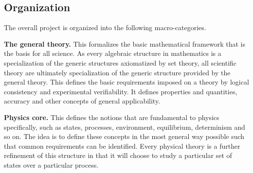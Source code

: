 \documentclass[twocolumn]{article}
\newif\ifextended
\newcommand\fact[2]{\ifextended \emph{#1}. #2 \fi}
\begin{document}
\fact{Forward engineering} {The goal of this phase is to construct an argument from the necessary assumptions outlined in the previous phase to rederive the framework at hand. This checks whether the necessary assumptions are also sufficient \footnote{For example, if we started simply by assuming we have density distributions mapped in time, this would give us all possible differentiable evolutions, not necessarily Hamiltonian ones.}. It ends when a set of necessary and sufficient conditions to rederive the theory are found, meaning that the full theory has been physically characterized.}

\fact{Formalization} {The goal of this phase is to take the previous set of arguments and formalize them in pure mathematical language. This forces us to clarify all the starting points and what parts of the arguments are truly formal and what are physical. Unfortunately, this can ultimately be done only by starting from the very foundations\footnote{For example, before formalizing Hamiltonian mechanics we have to formalize differentiable manifolds, real numbers and topological spaces.} though we are at a point where an overall tentative structure is emerging and tentative formalization can be attempted on higher structures.}

\subsection{Organization}

The overall project is organized into the following macro-categories.

\textbf{The general theory.} This formalizes the basic mathematical framework that is the basis for all science. As every algebraic structure in mathematics is a specialization of the generic structures axiomatized by set theory, all scientific theory are ultimately specialization of the generic structure provided by the general theory. This defines the basic requirements imposed on a theory by logical consistency and experimental verifiability. It defines properties and quantities, accuracy and other concepts of general applicability.

\textbf{Physics core.} This defines the notions that are fundamental to physics specifically, such as states, processes, environment, equilibrium, determinism and so on. The idea is to define these concepts in the most general way possible such that common requirements can be identified. Every physical theory is a further refinement of this structure in that it will choose to study a particular set of states over a particular process.
\end{document}
